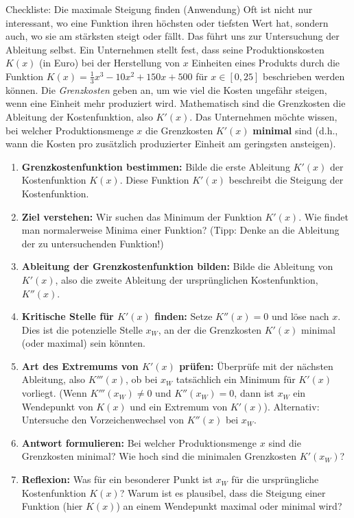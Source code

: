 \begin{aufgabenumgebung}{Checkliste: Die maximale Steigung finden (Anwendung)}
Oft ist nicht nur interessant, wo eine Funktion ihren höchsten oder tiefsten Wert hat, sondern auch, wo sie am stärksten steigt oder fällt. Das führt uns zur Untersuchung der Ableitung selbst.
Ein Unternehmen stellt fest, dass seine Produktionskosten $K(x)$ (in Euro) bei der Herstellung von $x$ Einheiten eines Produkts durch die Funktion $K(x) = \frac{1}{3}x^3 - 10x^2 + 150x + 500$ für $x \in [0, 25]$ beschrieben werden können.
Die \textit{Grenzkosten} geben an, um wie viel die Kosten ungefähr steigen, wenn eine Einheit mehr produziert wird. Mathematisch sind die Grenzkosten die Ableitung der Kostenfunktion, also $K'(x)$.
Das Unternehmen möchte wissen, bei welcher Produktionsmenge $x$ die Grenzkosten $K'(x)$ \textbf{minimal} sind (d.h., wann die Kosten pro zusätzlich produzierter Einheit am geringsten ansteigen).

\begin{enumerate}[label=(\alph*)]
    \item \textbf{Grenzkostenfunktion bestimmen:} Bilde die erste Ableitung $K'(x)$ der Kostenfunktion $K(x)$. Diese Funktion $K'(x)$ beschreibt die Steigung der Kostenfunktion.
    \item \textbf{Ziel verstehen:} Wir suchen das Minimum der Funktion $K'(x)$. Wie findet man normalerweise Minima einer Funktion? (Tipp: Denke an die Ableitung der zu untersuchenden Funktion!)
    \item \textbf{Ableitung der Grenzkostenfunktion bilden:} Bilde die Ableitung von $K'(x)$, also die zweite Ableitung der ursprünglichen Kostenfunktion, $K''(x)$.
    \item \textbf{Kritische Stelle für $K'(x)$ finden:} Setze $K''(x) = 0$ und löse nach $x$. Dies ist die potenzielle Stelle $x_W$, an der die Grenzkosten $K'(x)$ minimal (oder maximal) sein könnten.
    \item \textbf{Art des Extremums von $K'(x)$ prüfen:} Überprüfe mit der nächsten Ableitung, also $K'''(x)$, ob bei $x_W$ tatsächlich ein Minimum für $K'(x)$ vorliegt. (Wenn $K'''(x_W) \neq 0$ und $K''(x_W)=0$, dann ist $x_W$ ein Wendepunkt von $K(x)$ und ein Extremum von $K'(x)$). Alternativ: Untersuche den Vorzeichenwechsel von $K''(x)$ bei $x_W$.
    \item \textbf{Antwort formulieren:} Bei welcher Produktionsmenge $x$ sind die Grenzkosten minimal? Wie hoch sind die minimalen Grenzkosten $K'(x_W)$?
    \item \textbf{Reflexion:} Was für ein besonderer Punkt ist $x_W$ für die ursprüngliche Kostenfunktion $K(x)$? Warum ist es plausibel, dass die Steigung einer Funktion (hier $K(x)$) an einem Wendepunkt maximal oder minimal wird?
\end{enumerate}
\end{aufgabenumgebung}

